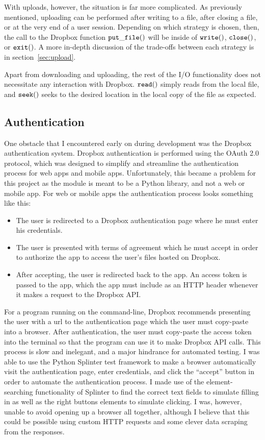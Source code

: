 \documentclass[pageno]{jpaper}
\begin{document}
With uploads, however, the situation is far more complicated. As previously mentioned, uploading can be performed after writing to a file, after closing a file, or at the very end of a user session. Depending on which strategy is chosen, then, the call to the Dropbox function $\tt{put\_file()}$ will be inside of $\tt{write()}$, $\tt{close()}$, or $\tt{exit()}$. A more in-depth discussion of the trade-offs between each strategy is in section~\ref{sec:upload}.

Apart from downloading and uploading, the rest of the I/O functionality does not necessitate any interaction with Dropbox. $\tt{read()}$ simply reads from the local file, and $\tt{seek()}$ seeks to the desired location in the local copy of the file as expected.

\subsection{Authentication}
One obstacle that I encountered early on during development was the Dropbox authentication system. Dropbox authentication is performed using the OAuth 2.0 protocol, which was designed to simplify and streamline the authentication process for web apps and mobile apps. Unfortunately, this became a problem for this project as the module is meant to be a Python library, and not a web or mobile app. For web or mobile apps the authentication process looks something like this:
\begin{itemize}
	\item The user is redirected to a Dropbox authentication page where he must enter his credentials.
	\item The user is presented with terms of agreement which he must accept in order to authorize the app to access the user's files hosted on Dropbox.
	\item After accepting, the user is redirected back to the app. An access token is passed to the app, which the app must include as an HTTP header whenever it makes a request to the Dropbox API.
\end{itemize}
For a program running on the command-line, Dropbox recommends presenting the user with a url to the authentication page which the user must copy-paste into a browser. After authentication, the user must copy-paste the access token into the terminal so that the program can use it to make Dropbox API calls. This process is slow and inelegant, and a major hindrance for automated testing. I was able to use the Python Splinter test framework to make a browser automatically visit the authentication page, enter credentials, and click the ``accept'' button in order to automate the authentication process. I made use of the element-searching functionality of Splinter to find the correct text fields to simulate filling in as well as the right buttons elements to simulate clicking. I was, however, unable to avoid opening up a browser all together, although I believe that this could be possible using custom HTTP requests and some clever data scraping from the responses.
\end{document}

